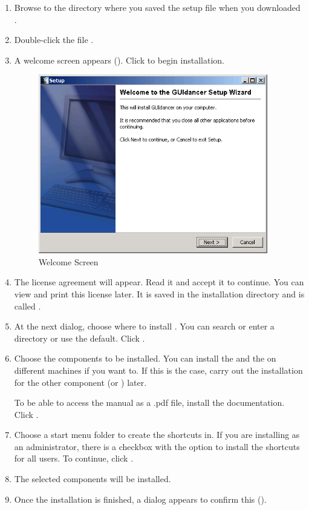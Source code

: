 

\begin{enumerate}
\item Browse to the directory where you saved the setup file when you downloaded \app{}. 
\item Double-click the file . 
\item A welcome screen appears (). Click  to begin installation. 

\begin{center}
\begin{figure}[h]
  \includegraphics[width=10cm]{Windows/PS/welcome}
  \caption{Welcome Screen}
  \label{figWelcome}
\end{figure}
\end{center}


\item The license agreement will appear. Read it and accept it to continue.  
You can view and print this license later. It is saved in the \app{} installation directory and is called . 
\item At the next dialog, choose where to install \app{}. You can search or enter a directory or use the default. Click .
\item Choose the components to be installed.
You can install the \gdagent and the \ite{} on different machines if you want to.  If this is the case, carry out the installation for the other component (\gdagent or \ite{}) later. 

To be able to access the manual as a .pdf file, install the  \app{} documentation. Click .
 

\item Choose a start menu folder to create the shortcuts in. If you are installing as an administrator, there is a checkbox with the option to install the shortcuts for all users. To continue, click
. 
\item The selected components will  be installed.
\item Once the installation is finished, a dialog appears to confirm this ().


\end{enumerate}
